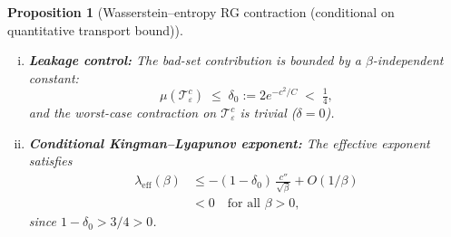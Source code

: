 \documentclass[12pt,a4paper]{article}
\theoremstyle{definition}
\theoremstyle{plain}
\newtheorem{proposition}[definition]{Proposition}
\theoremstyle{remark}
\begin{document}
\begin{proposition}[Wasserstein--entropy RG contraction (conditional on quantitative transport bound)]
\begin{enumerate}[(i)]
\item \textbf{Leakage control:}
  The bad-set contribution is bounded by a $\beta$-independent constant:
  \[
    \mu(\mathcal{T}_\varepsilon^c) \;\leq\; \delta_0 := 2e^{-c^2/C} \;<\; \tfrac{1}{4},
  \]
  and the worst-case contraction on $\mathcal{T}_\varepsilon^c$ is trivial ($\delta = 0$).

\item \textbf{Conditional Kingman--Lyapunov exponent:}
  The effective exponent satisfies
  \begin{equation}\label{eq:lambda-polynomial}
  \begin{aligned}
    \lambda_{\mathrm{eff}}(\beta)
    &\leq -(1 - \delta_0)\,\frac{c''}{\sqrt{\beta}} + O(1/\beta)\\
    &< 0 \quad\text{for all } \beta > 0,
  \end{aligned}
  \end{equation}
  since $1 - \delta_0 > 3/4 > 0$.
\end{enumerate}
\end{proposition}
\end{document}
